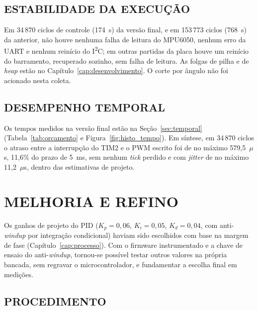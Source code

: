 \section{ESTABILIDADE DA EXECUÇÃO}

Em 34\,870 ciclos de controle (174~s) da versão final, e em 153\,773 ciclos (768~s) da anterior, não houve nenhuma falha de leitura do MPU6050, nenhum erro da UART e nenhum reinício do I\textsuperscript{2}C; em outras partidas da placa houve um reinício do barramento, recuperado sozinho, sem falha de leitura. As folgas de pilha e de \textit{heap} estão no Capítulo~\ref{cap:desenvolvimento}. O corte por ângulo não foi acionado nesta coleta.

\section{DESEMPENHO TEMPORAL}

Os tempos medidos na versão final estão na Seção~\ref{sec:temporal} (Tabela~\ref{tab:orcamento} e Figura~\ref{fig:histo_tempo}). Em síntese, em 34\,870 ciclos o atraso entre a interrupção do TIM2 e o PWM escrito foi de no máximo 579,5~$\mu$s, 11,6\% do prazo de 5~ms, sem nenhum \textit{tick} perdido e com \textit{jitter} de no máximo 11,2~$\mu$s, dentro das estimativas de projeto.

\chapter{MELHORIA E REFINO}\label{cap:refino}

Os ganhos de projeto do PID ($K_p=0{,}06$, $K_i=0{,}05$, $K_d=0{,}04$, com anti-\textit{windup} por integração condicional) haviam sido escolhidos com base na margem de fase (Capítulo~\ref{cap:processo}). Com o firmware instrumentado e a chave de ensaio do anti-\textit{windup}, tornou-se possível testar outros valores na própria bancada, sem regravar o microcontrolador, e fundamentar a escolha final em medições.

\section{PROCEDIMENTO}

